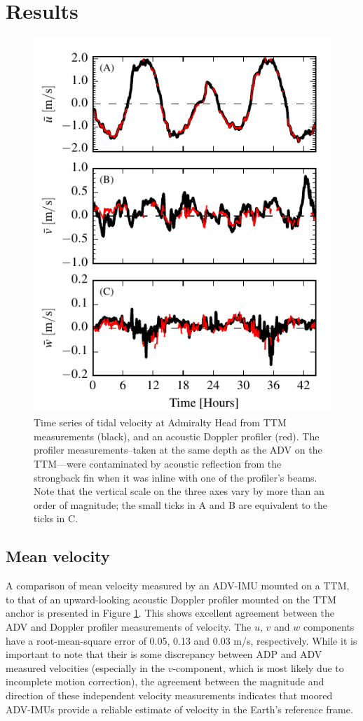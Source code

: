 \documentclass[twocol]{ametsoc}
\begin{document}
\section{Results}

\begin{figure}[t]
  \centering
  \includegraphics{TimeFig02}
  \caption{Time series of tidal velocity at Admiralty Head from TTM measurements (black), and an acoustic Doppler profiler (red). The profiler measurements--taken at the same depth as the ADV on the TTM---were contaminated by acoustic reflection from the strongback fin when it was inline with one of the profiler's beams. Note that the vertical scale on the three axes vary by more than an order of magnitude; the small ticks in A and B are equivalent to the ticks in C.}
  \label{fig:vel_time}
\end{figure}

\subsection{Mean velocity}

A comparison of mean velocity measured by an ADV-IMU mounted on a TTM, to that of an upward-looking acoustic Doppler profiler mounted on the TTM anchor is presented in Figure \ref{fig:vel_time}. This shows excellent agreement between the ADV and Doppler profiler measurements of velocity. The $u$, $v$ and $w$ components have a root-mean-square error of 0.05, 0.13 and 0.03 m/s, respectively. While it is important to note that their is some discrepancy between ADP and ADV measured velocities (especially in the $v$-component, which is most likely due to incomplete motion correction), the agreement between the magnitude and direction of these independent velocity measurements indicates that moored ADV-IMUs provide a reliable estimate of velocity in the Earth's reference frame.
\end{document}
